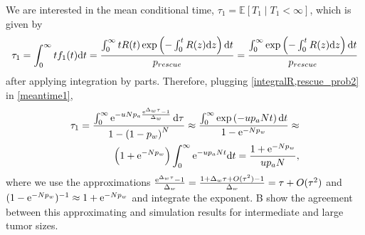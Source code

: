 \documentclass[12pt]{extarticle}
\renewcommand{\d}[1]{\ensuremath{\operatorname{d}\!{#1}}}
\renewcommand{\d}{{\rm d}}
\newcommand{\e}{{\rm e}}
\begin{document}
We are interested in the mean conditional time, $\tau_1=\mathbb{E}\left[T_1 \mid T_1<\infty\right]$, which is given by
\begin{equation}\label{meantime1}
\begin{aligned}
\tau_1 =
\int_{0}^{\infty}{t f_1(t) \d t} = 
\frac{\int_{0}^{\infty}{tR(t)\exp\left(-\int_0^{t}{R(z)\d z}\right) \d t}}{p_{rescue}} = 
\frac{\int_{0}^{\infty}{\exp\left(-\int_0^{t}{R(z)\d z}\right) \d t}}{p_{rescue}}
\end{aligned}
\end{equation}
after applying integration by parts.
Therefore, plugging \cref{integralR,rescue_prob2} in \cref{meantime1}, 
\begin{align}\label{limitapprox}
\tau_1 = 
\frac{\int_0^\infty\e^{-uNp_a\frac{\e^{\Delta_w\tau}-1}{\Delta_w}}\,\d\tau}{1-\left(1-p_w\right)^N} \approx
\frac{\int_{0}^{\infty}{\exp\left(-u p_a N t\right) \d t}}{1-\e^{-Np_w}} \approx \\
\left(1+\e^{-Np_w}\right)\int_0^\infty\e^{-u p_a N t} \d t =
\frac{1+\e^{-Np_w}}{u p_a N} ,
\end{align}
where we use the approximations 
$\frac{\e^{\Delta_w\tau}-1}{\Delta_w}=\frac{1+\Delta_w\tau+O(\tau^2)-1}{\Delta_w}=\tau+O(\tau^2)$ and $(1-\e^{-Np_w})^{-1} \approx 1+\e^{-Np_w}$ and integrate the exponent.
B show the agreement between this approximating and simulation results for intermediate and large tumor sizes.
\\
\end{document}
